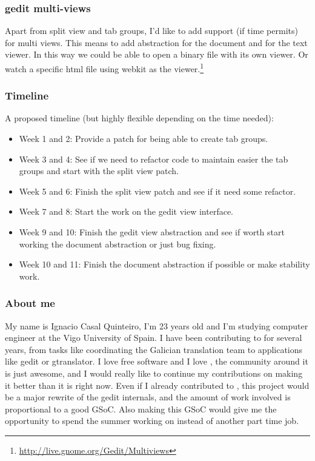\subsubsection{gedit multi-views}

Apart from split view and tab groups, I'd like to add support (if time permits) for multi views. This means to add abstraction for the document and for the text viewer. In this way we could be able to open a binary file with its own viewer. Or watch a specific html file using webkit as the viewer.\footnote{\url{http://live.gnome.org/Gedit/Multiviews}}

\subsubsection{Timeline}

A proposed timeline (but highly flexible depending on the time needed):

\begin{itemize}
  \item Week 1 and 2: Provide a patch for being able to create tab groups.
  \item Week 3 and 4: See if we need to refactor code to maintain easier the tab groups and start with the split view patch.
  \item Week 5 and 6: Finish the split view patch and see if it need some refactor.
  \item Week 7 and 8: Start the work on the gedit view interface.
  \item Week 9 and 10: Finish the gedit view abstraction and see if worth start working the document abstraction or just bug fixing.
  \item Week 10 and 11: Finish the document abstraction if possible or make stability work.
\end{itemize}

\subsubsection{About me}

My name is Ignacio Casal Quinteiro, I'm 23 years old and I'm studying computer engineer at the Vigo University of Spain. I have been contributing to \GNOME for several years, from tasks like coordinating the Galician translation team to applications like gedit or gtranslator. I love free software and I love \GNOME, the community around it is just awesome, and I would really like to continue my contributions on making it better than it is right now. Even if I already contributed to \GNOME, this project would be a major rewrite of the gedit internals, and the amount of work involved is proportional to a good GSoC. Also making this GSoC would give me the opportunity to spend the summer working on \GNOME instead of another part time job.

